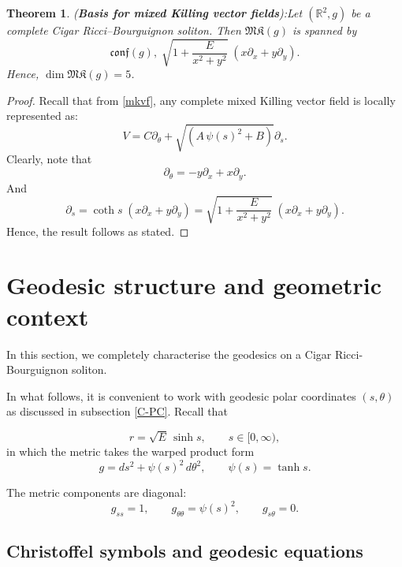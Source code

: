 \documentclass{article}
\newtheorem{theorem}{Theorem}[section]
\theoremstyle{definition}
\theoremstyle{remark}
\begin{document}
\begin{theorem}({\bf Basis for mixed Killing vector fields}):\label{bmkv}
Let $(\mathbb{R}^2,g)$ be a complete Cigar Ricci--Bourguignon soliton. Then $\mathfrak{MK}(g)$ is spanned by 
\[\mathfrak{conf}(g), \; 
 \sqrt{1+ \frac{E}{x^2+y^2} } \; \left(x \partial_x + y \partial_y\right) .
\]
Hence,  $\dim\mathfrak{MK}(g)=5$.
\end{theorem}

\begin{proof}
Recall that from \eqref{mkvf}, any complete mixed Killing vector 
field is locally represented as: 
$$V =  C   \partial_{\theta}  +   \sqrt{(A\,\psi(s)^2 + B)} \partial_s.$$ 
Clearly, note that 
 \[\partial_{\theta} = - y \partial_{x} + x \partial_{y}.\]
And 
 \[\partial_{s}  =  \coth s \; (x \partial_{x} + y \partial_{y})
=  \sqrt{1+ \frac{E}{x^2+y^2} } \; \left(x \partial_x + y \partial_y\right).
\]
Hence, the result follows as stated.
\end{proof}

\section{Geodesic structure and geometric context}\label{geocig}
In this section, we completely characterise the geodesics on a Cigar Ricci-Bourguignon soliton.


\vspace{0.1in}

\noindent
In what follows, it is convenient to work with geodesic polar coordinates $(s,\theta)$ 
as discussed in subsection \ref{C-PC}. Recall that

\begin{equation}\label{eq:geodesic-polar-coord}
r = \sqrt{E}\,\sinh s, \qquad s\in[0,\infty),
\end{equation}
in which the metric takes the warped product form
\begin{equation}\label{eq:warped-form}
g = ds^2 + \psi(s)^2\,d\theta^2, \qquad \psi(s)=\tanh s.
\end{equation}

The metric components are diagonal:
\[
g_{ss} = 1, \qquad g_{\theta\theta} = \psi(s)^2, \qquad g_{s\theta} = 0.
\]

\subsection{Christoffel symbols and geodesic equations}
\end{document}

